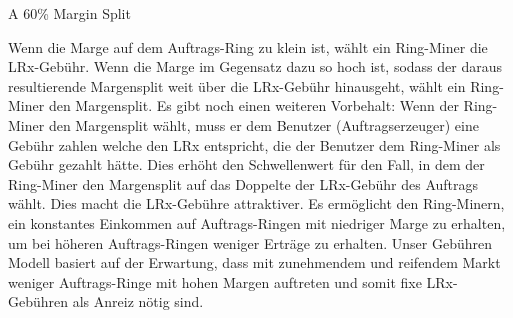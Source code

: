 \documentclass[UTF8,nofonts]{article}
\makeatletter
\newenvironment{figurehere}
 {\def\@captype{figure}}
 {}
\makeatother
\begin{document}
\begin{multicols}{2}
\begin{center}
\begin{figurehere}
\caption{A 60\% Margin Split}
\label{fig:marginsplit}
\end{figurehere}
\end{center}

Wenn die Marge auf dem Auftrags-Ring zu klein ist, wählt ein Ring-Miner die LRx-Gebühr. Wenn die Marge im Gegensatz dazu so hoch ist, sodass der daraus resultierende Margensplit weit über die LRx-Gebühr hinausgeht, wählt ein Ring-Miner den Margensplit. Es gibt noch einen weiteren Vorbehalt: Wenn der Ring-Miner den Margensplit wählt, muss er dem Benutzer (Auftragserzeuger) eine Gebühr zahlen welche den LRx entspricht, die der Benutzer dem Ring-Miner als Gebühr gezahlt hätte. Dies erhöht den Schwellenwert für den Fall, in dem der Ring-Miner den Margensplit auf das Doppelte der LRx-Gebühr des Auftrags wählt. Dies macht die LRx-Gebühre attraktiver. Es ermöglicht den Ring-Minern, ein konstantes Einkommen auf Auftrags-Ringen mit niedriger Marge zu erhalten, um bei höheren Auftrags-Ringen weniger Erträge zu erhalten. Unser Gebühren Modell basiert auf der Erwartung, dass mit zunehmendem und reifendem Markt weniger Auftrags-Ringe mit hohen Margen auftreten und somit fixe LRx-Gebühren als Anreiz nötig sind. 


\end{multicols}
\end{document}
